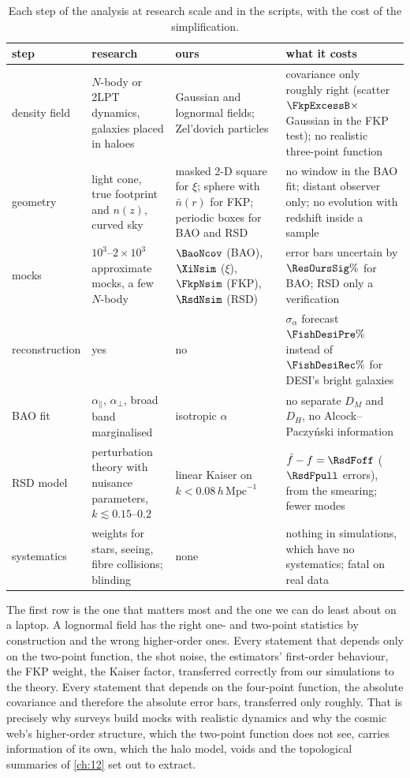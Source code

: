 \begin{table}[htbp]
\centering
\small
\begin{tabular}{p{2.0cm}p{3.6cm}p{3.6cm}p{4.0cm}}
\hline
step & research & ours & what it costs \\
\hline
density field & $N$-body or 2LPT dynamics, galaxies placed in haloes &
Gaussian and lognormal fields; Zel'dovich particles &
covariance only roughly right (scatter $\FkpExcessB\times$ Gaussian in the FKP
test); no realistic three-point function \\
geometry & light cone, true footprint and $n(z)$, curved sky &
masked 2-D square for $\xi$; sphere with $\bar n(r)$ for FKP; periodic boxes for BAO
and RSD & no window in the BAO fit; distant observer only; no evolution with
redshift inside a sample \\
mocks & $10^3$--$2\times10^3$ approximate mocks, a few $N$-body &
$\BaoNcov$ (BAO), $\XiNsim$ ($\xi$), $\FkpNsim$ (FKP), $\RsdNsim$ (RSD) &
error bars uncertain by $\ResOursSig\%$ for BAO; RSD only a verification \\
reconstruction & yes & no &
$\sigma_\alpha$ forecast $\FishDesiPre\%$ instead of $\FishDesiRec\%$ for DESI's bright
galaxies \\
BAO fit & $\alpha_\parallel$, $\alpha_\perp$, broad band marginalised &
isotropic $\alpha$ & no separate $D_M$ and $D_H$, no Alcock--Paczy\'nski
information \\
RSD model & perturbation theory with nuisance parameters, $k\lesssim0.15$--$0.2$ &
linear Kaiser on $k<0.08\,h\,\mathrm{Mpc}^{-1}$ &
$\hat f-f=\RsdFoff$ ($\RsdFpull$ errors), from the smearing; fewer modes \\
systematics & weights for stars, seeing, fibre collisions; blinding &
none & nothing in simulations, which have no systematics; fatal on real data \\
\hline
\end{tabular}
\caption{Each step of the analysis at research scale and in the
scripts, with the cost of the simplification.}
\label{11a:tab:nerfs}
\end{table}

The first row is the one that matters most and the one we can do least about on
a laptop. A lognormal field has the right one- and two-point statistics by
construction and the wrong higher-order ones. Every statement
that depends only on the two-point function, the shot noise, the estimators'
first-order behaviour, the FKP weight, the Kaiser factor, transferred correctly
from our simulations to the theory. Every statement that depends on the
four-point function, the absolute covariance and therefore the absolute error
bars, transferred only roughly. That is precisely why surveys build mocks with
realistic dynamics and why the cosmic web's higher-order structure, which the
two-point function does not see, carries information of its own, which the halo
model, voids and the topological summaries of \cref{ch:12} set out to extract.

